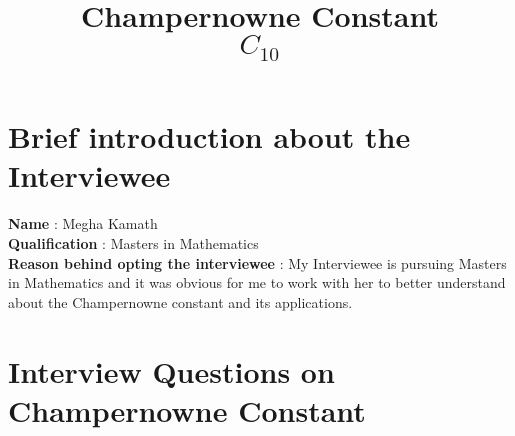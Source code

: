 \documentclass{article}
\title{Champernowne Constant\[ C_{10}\]}
\begin{document}
\maketitle
\section*{Brief introduction about the Interviewee}
{\bf Name} : Megha Kamath \\
{\bf Qualification} : Masters in Mathematics \\
{\bf Reason behind opting the interviewee} : My Interviewee is pursuing Masters in Mathematics and it was obvious for me to work with her to better understand about the Champernowne constant and its applications.
\section*{Interview Questions on Champernowne Constant}
\end{document}
